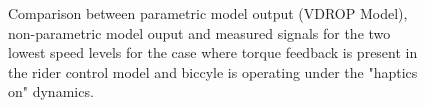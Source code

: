 \begin{figure}[!h]
    \centering
    \begin{subfigure}[b]{\textwidth}
        \centering
        \caption{}
        \label{fig:ropm_fit1}
    \end{subfigure}
    \begin{subfigure}[b]{\textwidth}
        \centering
        \caption{}
        \label{fig:ropm_fit2}
    \end{subfigure}
    
    \caption{Comparison between parametric model output (VDROP Model), non-parametric model ouput and measured signals for the two lowest speed levels for the case where torque feedback is present in the rider control model and biccyle is operating under the "haptics on" dynamics.}
    \label{fig:ropm_fitA}
 \end{figure}

